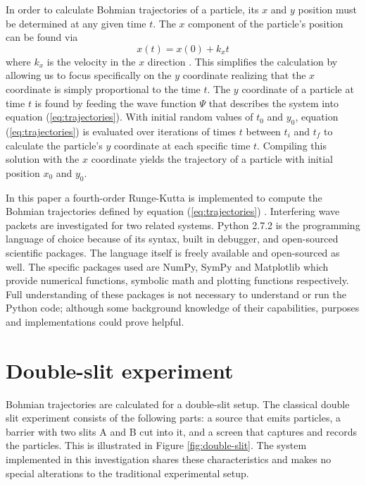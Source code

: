 \documentclass[10pt, reqno]{article}
\begin{document}
  In order to calculate Bohmian trajectories of a particle, its $x$ and $y$ position must be determined at any given time $t$.
  The $x$ component of the particle's position can be found via 
  \begin{equation}
    x(t) = x(0) + k_x t 
  \end{equation}
  where $k_x$ is the velocity in the $x$ direction \cite{guay}.
  This simplifies the calculation by allowing us to focus specifically on the $y$ coordinate realizing that 
    the $x$ coordinate is simply proportional to the time $t$.
  The $y$ coordinate of a particle at time $t$ is found by feeding the wave function $\Psi$ that describes the system into equation (\ref{eq:trajectories}).
  With initial random values of $t_0$ and $y_0$, equation (\ref{eq:trajectories}) is evaluated over iterations of times $t$ between $t_i$ and $t_f$ to calculate the 
    particle's $y$ coordinate at each specific time $t$.
  Compiling this solution with the $x$ coordinate yields the trajectory of a particle with initial position $x_0$ and $y_0$.
  
  In this paper a fourth-order Runge-Kutta is implemented to compute the Bohmian trajectories defined by equation (\ref{eq:trajectories}) \cite{dowsa}.
  Interfering wave packets are investigated for two related systems.
  Python 2.7.2 is the programming language of choice because of its syntax, built in debugger, and open-sourced scientific packages.
  The language itself is freely available and open-sourced as well.
  The specific packages used are NumPy, SymPy and Matplotlib which provide numerical functions, symbolic math and plotting functions respectively.
  Full understanding of these packages is not necessary to understand or run the Python code; 
    although some background knowledge of their capabilities, purposes and implementations could prove helpful.



\section{Double-slit experiment}

  Bohmian trajectories are calculated for a double-slit setup.
  The classical double slit experiment consists of the following parts:
    a source that emits particles,
    a barrier with two slits A and B cut into it,
    and a screen that captures and records the particles.
  This is illustrated in Figure \ref{fig:double-slit}.
  The system implemented in this investigation shares these characteristics and makes no special alterations to the traditional experimental setup.
\end{document}
